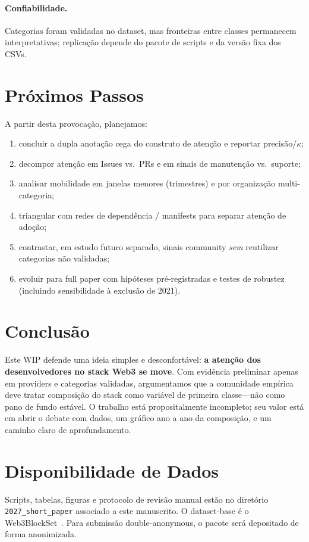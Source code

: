 \documentclass[10pt,conference]{IEEEtran}
\begin{document}
\paragraph{Confiabilidade.}
Categorias foram validadas no dataset, mas fronteiras entre classes permanecem interpretativas; replicação depende do pacote de scripts e da versão fixa dos CSVs.

\section{Próximos Passos}

A partir desta provocação, planejamos:
\begin{enumerate}
\item concluir a dupla anotação cega do construto de atenção e reportar precisão/$\kappa$;
\item decompor atenção em Issues vs.\ PRs e em sinais de manutenção vs.\ suporte;
\item analisar mobilidade em janelas menores (trimestres) e por organização multi-categoria;
\item triangular com redes de dependência / manifests para separar atenção de adoção;
\item contrastar, em estudo futuro separado, sinais community \emph{sem} reutilizar categorias não validadas;
\item evoluir para full paper com hipóteses pré-registradas e testes de robustez (incluindo sensibilidade à exclusão de 2021).
\end{enumerate}

\section{Conclusão}

Este WIP defende uma ideia simples e desconfortável: \textbf{a atenção dos desenvolvedores no stack Web3 se move}. Com evidência preliminar apenas em providers e categorias validadas, argumentamos que a comunidade empírica deve tratar composição do stack como variável de primeira classe---não como pano de fundo estável. O trabalho está propositalmente incompleto; seu valor está em abrir o debate com dados, um gráfico ano a ano da composição, e um caminho claro de aprofundamento.

\section*{Disponibilidade de Dados}
Scripts, tabelas, figuras e protocolo de revisão manual estão no diretório \texttt{2027\_short\_paper} associado a este manuscrito. O dataset-base é o Web3BlockSet~\cite{soares2026web3blockset}. Para submissão double-anonymous, o pacote será depositado de forma anonimizada.



\end{document}
